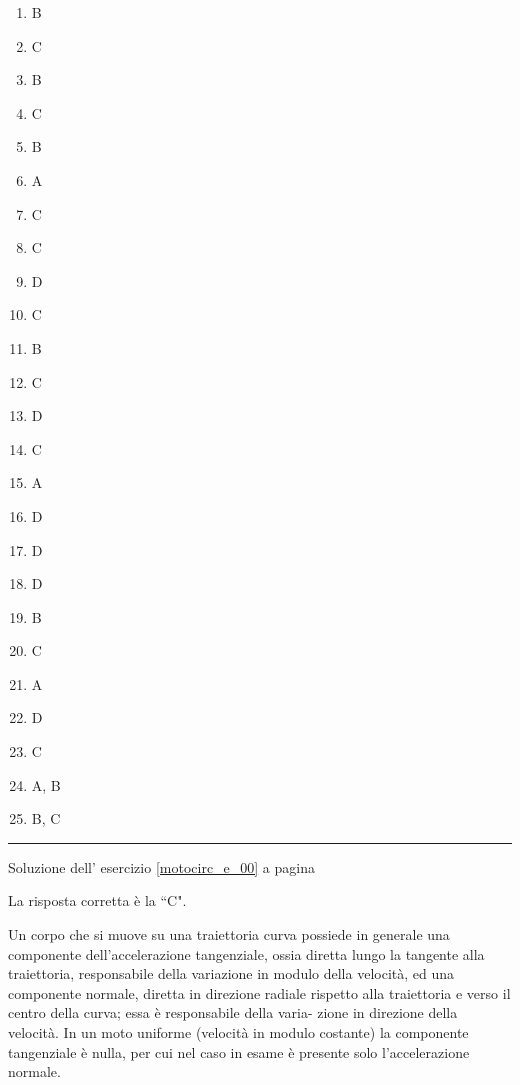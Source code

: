 \begin{enumerate}
\item B
\item C
\item B
\item C
\item B
\item A
\item C
\item C
\item D
\item C
\item B
\item C
\item D
\item C
\item A
\item D
\item D
\item D
\item B
\item C
\item A
\item D
\item C
\item A, B
\item B, C
\end{enumerate}



\vspace{1cm}
\hrule
\vspace{1cm}


Soluzione dell' esercizio \ref{motocirc_e_00} a pagina \pageref{motocirc_e_00} \label{motocirc_s_00}

La risposta corretta è la ``C".

Un corpo che si muove su una traiettoria curva possiede in generale una componente
dell’accelerazione tangenziale, ossia diretta lungo la tangente alla traiettoria, responsabile
della variazione in modulo della velocità, ed una componente normale, diretta in direzione
radiale rispetto alla traiettoria e verso il centro della curva; essa è responsabile della varia-
zione in direzione della velocità. In un moto uniforme (velocità in modulo costante) la
componente tangenziale è nulla, per cui nel caso in esame è presente solo l’accelerazione
normale. 


